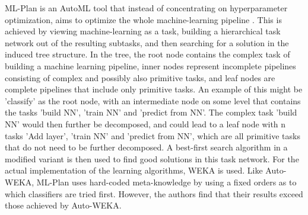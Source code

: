 ML-Plan is an AutoML tool that instead of concentrating on hyperparameter optimization, aims to optimize the whole machine-learning pipeline \cite{wever2017automatic}. This is achieved by viewing machine-learning as a task, building a hierarchical task network out of the resulting subtasks, and then searching for a solution in the induced tree structure. In the tree, the root node contains the complex task of building a machine learning pipeline, inner nodes represent incomplete pipelines consisting of complex and possibly also primitive tasks, and leaf nodes are complete pipelines that include only primitive tasks. An example of this might be 'classify' as the root node, with an intermediate node on some level that contains the tasks 'build NN', 'train NN' and 'predict from NN'. The complex task 'build NN' would then further be decomposed, and could lead to a leaf node with n tasks 'Add layer', 'train NN' and 'predict from NN', which are all primitive tasks that do not need to be further decomposed. A best-first search algorithm in a modified variant is then used to find good solutions in this task network. For the actual implementation of the learning algorithms, WEKA is used. Like Auto-WEKA, ML-Plan uses hard-coded meta-knowledge by using a fixed orders as to which classifiers are tried first. However, the authors find that their results exceed those achieved by Auto-WEKA.\\

